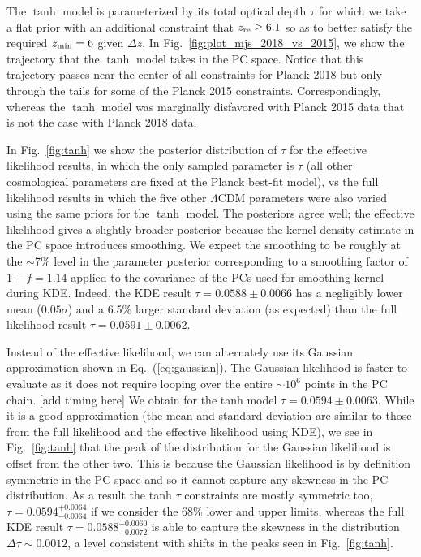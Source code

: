 \documentclass[prd,twocolumn,amsmath,amssymb,floatfix,superscriptaddress,nofootinbib]{revtex4-1}
\newcommand{\reffig}[1]{Fig.~\ref{fig:#1}}
\newcommand{\zre}{z_{\rm re}}
\begin{document}
The $\tanh$ model is parameterized by its total optical depth $\tau$ for which we take a flat prior 
with an additional constraint that $z_{\rm re}\ge 6.1$ so as to better satisfy the required $z_{\rm min}=6$ given $\Delta z$.
In Fig.~\ref{fig:plot_mjs_2018_vs_2015}, we show the trajectory that the $\tanh$ model takes in the PC space. Notice that this trajectory passes near the center of all constraints for Planck 2018 but only through the tails for some of the Planck 2015 constraints.  Correspondingly, whereas the $\tanh$ model was marginally disfavored with Planck 2015 data that is not the case with Planck 2018 data. 

In \reffig{tanh} we show the posterior distribution of $\tau$ for the effective likelihood results, in which the only sampled parameter is $\tau$ (all other cosmological parameters are fixed at the Planck best-fit model), vs the full likelihood results in which the five other $\Lambda$CDM parameters were also varied using the same priors for the $\tanh$ model.
The posteriors agree well; the effective likelihood gives a slightly broader posterior because the kernel density estimate in the PC space introduces smoothing. We expect the smoothing to be roughly at the $\sim$7\% level in the parameter posterior corresponding to a smoothing factor of $1+f = 1.14$ applied to the covariance of the PCs used for smoothing kernel during KDE. Indeed, the KDE result $\tau = 0.0588 \pm 0.0066$ has a negligibly lower mean ($0.05\sigma$) and a 6.5\% larger standard deviation (as expected) than the full likelihood result $\tau = 0.0591 \pm 0.0062$.

Instead of the effective likelihood, we can alternately use its Gaussian approximation shown in Eq.~(\ref{eq:gaussian}). The Gaussian likelihood is faster to evaluate as it does not require looping over the entire $\sim 10^6$ points in the PC chain. [add timing here]
We obtain for the tanh model $\tau = 0.0594 \pm 0.0063$. While it is a good approximation (the mean and standard deviation are similar to those from the full likelihood and the effective likelihood using KDE), we see in Fig.~\ref{fig:tanh} that the peak of the distribution for the Gaussian likelihood is offset from the other two. This is because the Gaussian likelihood is by definition symmetric in the PC space and so it cannot capture any skewness in the PC distribution. As a result the tanh $\tau$ constraints are mostly symmetric too, $\tau = 0.0594_{-0.0064}^{+0.0064}$ if we consider the 68\% lower and upper limits, whereas the full KDE result $\tau = 0.0588_{-0.0072}^{+0.0060}$ is able to capture the skewness in the distribution $\Delta \tau \sim 0.0012$, a level consistent with shifts in the peaks seen in Fig.~\ref{fig:tanh}.
\end{document}

